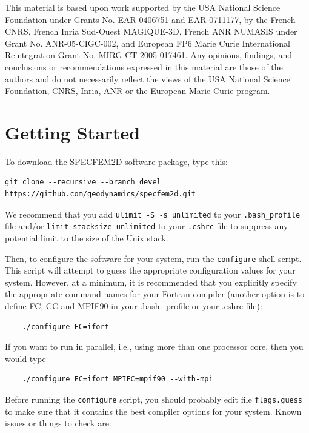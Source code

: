 \documentclass[oneside,english,onecolumn,letterpaper]{book}
\begin{document}
This material is based upon work supported by the USA National Science
Foundation under Grants No. EAR-0406751 and EAR-0711177, by the French
CNRS, French Inria Sud-Ouest MAGIQUE-3D, French ANR NUMASIS under
Grant No. ANR-05-CIGC-002, and European FP6 Marie Curie International
Reintegration Grant No. MIRG-CT-2005-017461.
Any opinions, findings, and conclusions or recommendations expressed in this material are
those of the authors and do not necessarily reflect the views of the
USA National Science Foundation, CNRS, Inria, ANR or the European
Marie Curie program.




\chapter{\label{cha:Getting-Started}Getting Started}


To download the SPECFEM2D software package, type this:
\begin{verbatim}
git clone --recursive --branch devel https://github.com/geodynamics/specfem2d.git
\end{verbatim}

We recommend that you add \texttt{ulimit -S -s unlimited} to your \texttt{.bash\_profile} file and/or \texttt{limit stacksize unlimited} to your \texttt{.cshrc} file to suppress any potential limit to the size of the Unix stack.

Then, to configure the software for your system, run the
\texttt{configure} shell script. This script will attempt to guess
the appropriate configuration values for your system. However, at
a minimum, it is recommended that you explicitly specify the appropriate
command names for your Fortran compiler (another option is to define FC, CC and MPIF90 in your .bash\_profile
or your .cshrc file):
%
\begin{verbatim}
    ./configure FC=ifort
\end{verbatim}
%
If you want to run in parallel, i.e., using more than one processor core, then you would type
%
\begin{verbatim}
    ./configure FC=ifort MPIFC=mpif90 --with-mpi
\end{verbatim}

Before running the \texttt{configure} script, you should probably edit file \texttt{flags.guess} to make sure that it contains the best compiler options for your system. Known issues or things to check are:
\end{document}
